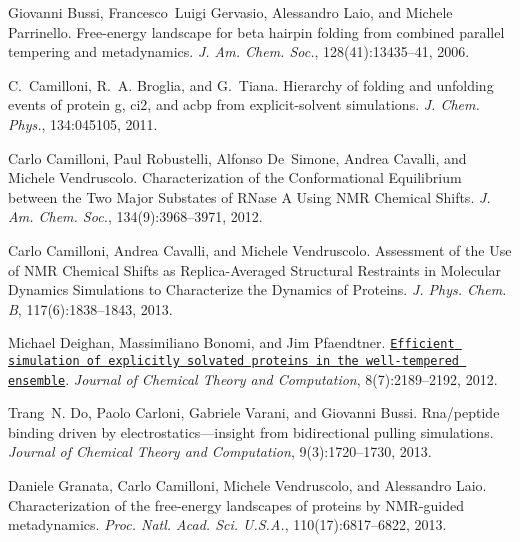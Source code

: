 \begin{DoxyDescription}
\item[\label{_CITEREF_bussi_xc}%
\mbox{[}9\mbox{]}]Giovanni Bussi, Francesco~Luigi Gervasio, Alessandro Laio, and Michele Parrinello. Free-\/energy landscape for beta hairpin folding from combined parallel tempering and metadynamics. {\itshape J. Am. Chem. Soc.}, 128(41)\+:13435--41, 2006.


\item[\label{_CITEREF_camilloni11abmd}%
\mbox{[}10\mbox{]}]C.~Camilloni, R.~A. Broglia, and G.~Tiana. Hierarchy of folding and unfolding events of protein g, ci2, and acbp from explicit-\/solvent simulations. {\itshape J. Chem. Phys.}, 134\+:045105, 2011.


\item[\label{_CITEREF_Camilloni:2012je}%
\mbox{[}11\mbox{]}]Carlo Camilloni, Paul Robustelli, Alfonso De~Simone, Andrea Cavalli, and Michele Vendruscolo. Characterization of the Conformational Equilibrium between the Two Major Substates of R\+Nase A Using N\+M\+R Chemical Shifts. {\itshape J. Am. Chem. Soc.}, 134(9)\+:3968--3971, 2012.


\item[\label{_CITEREF_Camilloni:2013hs}%
\mbox{[}12\mbox{]}]Carlo Camilloni, Andrea Cavalli, and Michele Vendruscolo. Assessment of the Use of N\+M\+R Chemical Shifts as Replica-\/\+Averaged Structural Restraints in Molecular Dynamics Simulations to Characterize the Dynamics of Proteins. {\itshape J. Phys. Chem. B}, 117(6)\+:1838--1843, 2013.


\item[\label{_CITEREF_ct300297t}%
\mbox{[}13\mbox{]}]Michael Deighan, Massimiliano Bonomi, and Jim Pfaendtner. \href{http://pubs.acs.org/doi/abs/10.1021/ct300297t}{\tt Efficient simulation of explicitly solvated proteins in the well-\/tempered ensemble}. {\itshape Journal of Chemical Theory and Computation}, 8(7)\+:2189--2192, 2012. 


\item[\label{_CITEREF_do13jctc}%
\mbox{[}14\mbox{]}]Trang~N. Do, Paolo Carloni, Gabriele Varani, and Giovanni Bussi. Rna/peptide binding driven by electrostatics—insight from bidirectional pulling simulations. {\itshape Journal of Chemical Theory and Computation}, 9(3)\+:1720--1730, 2013. 


\item[\label{_CITEREF_Granata:2013dk}%
\mbox{[}15\mbox{]}]Daniele Granata, Carlo Camilloni, Michele Vendruscolo, and Alessandro Laio. Characterization of the free-\/energy landscapes of proteins by N\+M\+R-\/guided metadynamics. {\itshape Proc. Natl. Acad. Sci. U.\+S.\+A.}, 110(17)\+:6817--6822, 2013.



\end{DoxyDescription}
